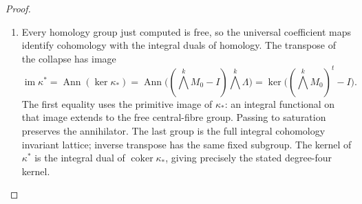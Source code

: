\begin{proof}
\begin{enumerate}[label={$\langle1\rangle$\arabic*.}]
\item Every homology group just computed is free, so the universal
coefficient maps identify cohomology with the integral duals of homology.
The transpose of the collapse has image
\[
 \operatorname{im}\kappa^*
 =\operatorname{Ann}(\ker\kappa_*)
 =\operatorname{Ann}\bigl((\bigwedge^kM_0-I)\bigwedge^k\Lambda\bigr)
 =\ker\bigl((\bigwedge^kM_0)^t-I\bigr).
\]
The first equality uses the primitive image of $\kappa_*$: an integral
functional on that image extends to the free central-fibre group.
Passing to saturation preserves the annihilator. The last group is
the full integral cohomology invariant lattice; inverse transpose
has the same fixed subgroup. The kernel of $\kappa^*$ is the
integral dual of $\operatorname{coker}\kappa_*$, giving precisely the
stated degree-four kernel.
\end{enumerate}
\end{proof}

